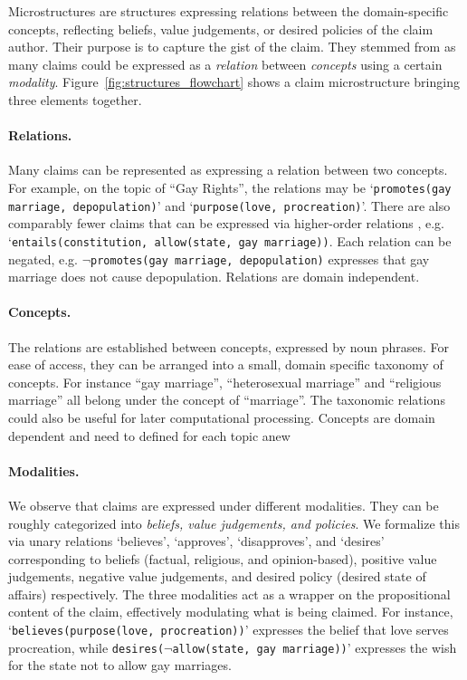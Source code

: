 Microstructures are structures expressing relations between the domain-specific
concepts, reflecting beliefs, value judgements, or desired policies of the claim
author. Their purpose is to capture the gist of the claim. 
They stemmed from as many claims could be expressed as a \emph{relation}
between \emph{concepts} using a certain \emph{modality}. 
Figure~\ref{fig:structures_flowchart} shows a claim microstructure bringing three elements 
together. 

\paragraph{Relations. }  Many claims can be represented as expressing a
relation between two concepts. For example, on the topic of ``Gay Rights'', 
the relations may be `\texttt{promotes(gay marriage, depopulation)}' and 
`\texttt{purpose(love, procreation)}'. 
There are also comparably fewer claims that can be expressed via
higher-order relations , e.g. `\texttt{entails(constitution, allow(state, gay marriage))}. 
Each relation can be negated, e.g. $\neg$\texttt{promotes(gay marriage,
depopulation)} expresses that gay marriage does not cause depopulation. 
Relations are domain independent. 

\paragraph{Concepts. }
The relations are established between concepts, expressed by noun phrases. 
For ease of access, they can be arranged into a small, domain specific taxonomy of concepts. 
For instance ``gay marriage'', ``heterosexual marriage'' and ``religious marriage''
all belong under the concept of ``marriage''. 
The taxonomic relations could also be useful for later computational processing. 
Concepts are domain dependent and need to defined for each topic anew

\paragraph{Modalities. }
We observe that claims are expressed under different modalities. 
They can be roughly categorized into \textit{beliefs, value judgements, and policies}. 
We formalize this via unary relations `believes', `approves', `disapproves',
and `desires' corresponding 
to beliefs (factual, religious, and opinion-based), positive value judgements, negative value 
judgements, and desired policy (desired state of affairs) respectively. 
The three modalities act as a wrapper on the propositional content of the claim, 
effectively modulating what is being claimed. 
For instance, `\texttt{believes(purpose(love, procreation))}' expresses the belief 
that love serves procreation, while \texttt{desires(}$\neg$\texttt{allow(state, gay marriage))}'
expresses the wish for the state not to allow gay marriages. 

